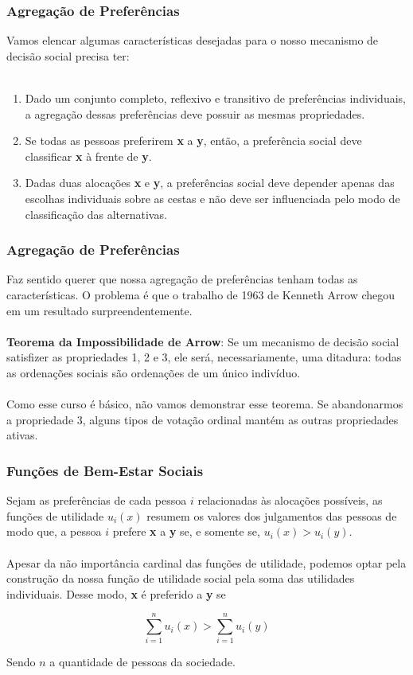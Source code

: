\documentclass{beamer}[10]
\begin{document}
\begin{frame}
	\frametitle{Agregação de Preferências}

	Vamos elencar algumas características desejadas para o nosso mecanismo de decisão social precisa ter:
	\\~\\
	\begin{enumerate}
		\item Dado um conjunto completo, reflexivo e transitivo de preferências individuais, a agregação dessas preferências deve possuir as mesmas propriedades.
		\item Se todas as pessoas preferirem \textbf{x} a \textbf{y}, então, a preferência social deve classificar \textbf{x} à frente de \textbf{y}.
		\item Dadas duas alocações \textbf{x} e \textbf{y}, a preferências social deve depender apenas das escolhas individuais sobre as cestas e não deve ser influenciada pelo modo de classificação das alternativas.
	\end{enumerate}

\end{frame}

\begin{frame}
	\frametitle{Agregação de Preferências}

	Faz sentido querer que nossa agregação de preferências tenham todas as características. O problema é que o trabalho de 1963 de Kenneth Arrow chegou em um resultado surpreendentemente.
	\\~\\
	\textbf{Teorema da Impossibilidade de Arrow}: Se um mecanismo de decisão social satisfizer as propriedades 1, 2 e 3, ele será, necessariamente, uma ditadura: todas as ordenações sociais são ordenações de um único indivíduo.
	\\~\\
	Como esse curso é básico, não vamos demonstrar esse teorema. Se abandonarmos a propriedade 3, alguns tipos de votação ordinal mantém as outras propriedades ativas.

\end{frame}

\begin{frame}
	\frametitle{Funções de Bem-Estar Sociais}

	Sejam as preferências de cada pessoa $i$ relacionadas às alocações possíveis, as funções de utilidade $u_i(x)$ resumem os valores dos julgamentos das pessoas de modo que, a pessoa $i$ prefere \textbf{x} a \textbf{y} se, e somente se, $u_i(x) > u_i(y)$.
	\\~\\
	Apesar da não importância cardinal das funções de utilidade, podemos optar pela construção da nossa função de utilidade social pela soma das utilidades individuais. Desse modo, \textbf{x} é preferido a \textbf{y} se

	$$  \displaystyle \sum^n_{i = 1} u_i(x) > \sum^n_{i = 1} u_i(y)$$

	Sendo $n$ a quantidade de pessoas da sociedade.

\end{frame}
\end{document}
